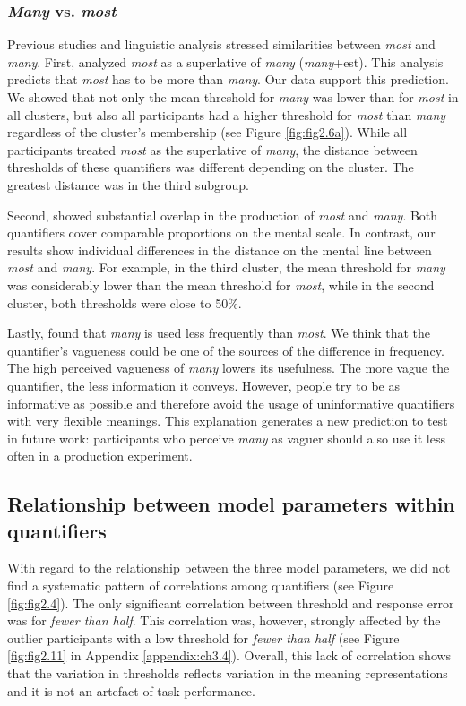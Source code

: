 \documentclass{article}
\begin{document}
\subsubsection{\textit{Many} vs. \textit{most}}
Previous studies and linguistic analysis \cite{Hackl2009, Pezzelle2018} stressed similarities between \textit{most} and \textit{many}. First,  analyzed \textit{most} as a superlative of \textit{many} (\textit{many}+est). This analysis predicts that \textit{most} has to be more than \textit{many}. Our data support this prediction. We showed that not only the mean threshold for \textit{many} was lower than for \textit{most} in all clusters, but also all participants had a higher threshold for \textit{most} than \textit{many} regardless of the cluster's membership (see Figure \ref{fig:fig2.6a}). While all participants treated \textit{most} as the superlative of \textit{many}, the distance between thresholds of these quantifiers was different depending on the cluster. The greatest distance was in the third subgroup.

Second,  showed substantial overlap in the production of \textit{most} and \textit{many}. Both quantifiers cover comparable proportions on the mental scale. In contrast, our results show individual differences in the distance on the mental line between \textit{most} and \textit{many}. For example, in the third cluster, the mean threshold for \textit{many} was considerably lower than the mean threshold for \textit{most}, while in the second cluster, both thresholds were close to 50\%.

Lastly,  found that \textit{many} is used less frequently than \textit{most}. We think that the quantifier's vagueness could be one of the sources of the difference in frequency. The high perceived vagueness of \textit{many} lowers its usefulness. The more vague the quantifier, the less information it conveys. However, people try to be as informative as possible \cite{Grice1975} and therefore avoid the usage of uninformative quantifiers with very flexible meanings. This explanation generates a new prediction to test in future work: participants who perceive \textit{many} as vaguer should also use it less often in a production experiment.

\subsection{Relationship between model parameters within quantifiers}
With regard to the relationship between the three model parameters, we did not find a systematic pattern of correlations among quantifiers (see Figure \ref{fig:fig2.4}). The only significant correlation between threshold and response error was for \textit{fewer than half}. This correlation was, however, strongly affected by the outlier participants with a low threshold for \textit{fewer than half} (see Figure \ref{fig:fig2.11} in Appendix \ref{appendix:ch3.4}). Overall, this lack of correlation shows that the variation in thresholds reflects variation in the meaning representations and it is not an artefact of task performance.
\end{document}
